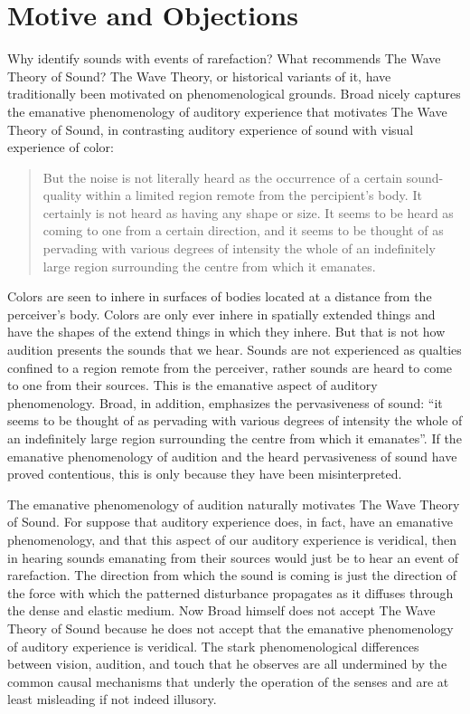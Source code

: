 \documentclass[12pt]{article}
\begin{document}

\section{Motive and Objections} %
\label{sec:motive_and_objections}


Why identify sounds with events of rarefaction? What recommends The Wave Theory of Sound? The Wave Theory, or historical variants of it, have traditionally been motivated on phenomenological grounds. Broad nicely captures the emanative phenomenology of auditory experience that motivates The Wave Theory of Sound, in contrasting auditory experience of sound with visual experience of color:
\begin{quote}
	But the noise is not literally heard as the occurrence of a certain sound-quality within a limited region remote from the percipient's body. It certainly is not heard as having any shape or size. It seems to be heard as coming to one from a certain direction, and it seems to be thought of as pervading with various degrees of intensity the whole of an indefinitely large region surrounding the centre from which it emanates. \citep[5]{Broad:1952kx}
\end{quote}
Colors are seen to inhere in surfaces of bodies located at a distance from the perceiver's body. Colors are only ever inhere in spatially extended things and have the shapes of the extend things in which they inhere. But that is not how audition presents the sounds that we hear. Sounds are not experienced as qualties confined to a region remote from the perceiver, rather sounds are heard to come to one from their sources. This is the emanative aspect of auditory phenomenology. Broad, in addition, emphasizes the pervasiveness of sound: ``it seems to be thought of as pervading with various degrees of intensity the whole of an indefinitely large region surrounding the centre from which it emanates''. If the emanative phenomenology of audition and the heard pervasiveness of sound have proved contentious, this is only because they have been misinterpreted.

The emanative phenomenology of audition naturally motivates The Wave Theory of Sound. For suppose that auditory experience does, in fact, have an emanative phenomenology, and that this aspect of our auditory experience is veridical, then in hearing sounds emanating from their sources would just be to hear an event of rarefaction. The direction from which the sound is coming is just the direction of the force with which the patterned disturbance propagates as it diffuses through the dense and elastic medium. Now Broad himself does not accept The Wave Theory of Sound because he does not accept that the emanative phenomenology of auditory experience is veridical. The stark phenomenological differences between vision, audition, and touch that he observes are all undermined by the common causal mechanisms that underly the operation of the senses and are at least misleading if not indeed illusory. 
\end{document}
